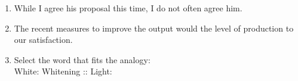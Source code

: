 \documentclass[12pt,onecolumn]{article}
\begin{document}
\begin{enumerate}
    \item While I agree \underline{\hspace{2cm}} his proposal this time, I do not often agree \underline{\hspace{2cm}} him.
          \begin{enumerate}
          \end{enumerate}

    \item The recent measures to improve the output would \underline{\hspace{2cm}} the level of production to our satisfaction.
          \begin{enumerate}
          \end{enumerate}

    \item Select the word that fits the analogy:\\
          White: Whitening :: Light: \underline{\hspace{2cm}}
          \begin{enumerate}
          \end{enumerate}


\end{enumerate}
\end{document}
